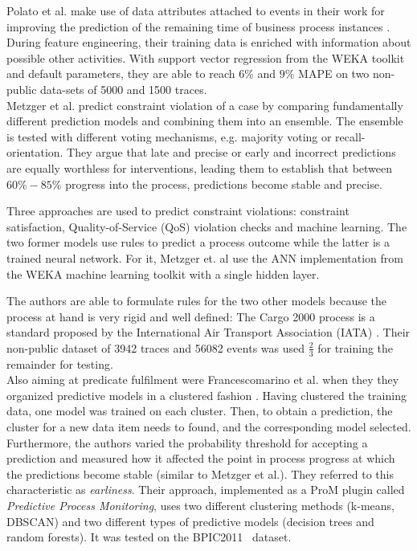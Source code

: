 Polato et al. make use of data attributes attached to events in their work for improving the prediction of the remaining time of business process instances \cite{polato2014}. During feature engineering, their training data is enriched with information about possible other activities. With support vector regression from the WEKA toolkit~\cite{web:weka} and default parameters, they are able to reach $6\%$ and $9\%$ MAPE on two non-public data-sets of 5000 and 1500 traces.\\

Metzger et al. predict constraint violation of a case by comparing fundamentally different prediction models and combining them into an ensemble. The ensemble is tested with different voting mechanisms, e.g. majority voting or recall-orientation. They argue that late and precise or early and incorrect predictions are equally worthless for interventions, leading them to establish that between $60\% - 85\%$ progress into the process, predictions become stable and precise.

Three approaches are used to predict constraint violations: constraint satisfaction, Quality-of-Service (QoS) violation checks and machine learning. The two former models use rules to predict a process outcome while the latter is a trained neural network. For it, Metzger et. al use the ANN implementation from the WEKA machine learning toolkit with a single hidden layer. 

The authors are able to formulate rules for the two other models because the process at hand is very rigid and well defined: The Cargo 2000 process is a standard proposed by the International Air Transport Association (IATA) \cite{metzger2015}. Their non-public dataset of 3942 traces and 56082 events was used $\frac{2}{3}$ for training the remainder for testing.\\

Also aiming at predicate fulfilment were Francescomarino et al. when they they organized predictive models in a clustered fashion \cite{francescomarino2015}. Having clustered the training data, one model was trained on each cluster. Then, to obtain a prediction, the cluster for a new data item needs to found, and the corresponding model selected. Furthermore, the authors varied the probability threshold for accepting a prediction and measured how it affected the point in process progress at which the predictions become stable (similar to Metzger et al.). They referred to this characteristic as \textit{earliness}. Their approach, implemented as a ProM plugin called \textit{Predictive Process Monitoring}, uses two different clustering methods (k-means, DBSCAN) and two different types of predictive models (decision trees and random forests). It was tested on the BPIC2011~\cite{BPIC2011} dataset.


